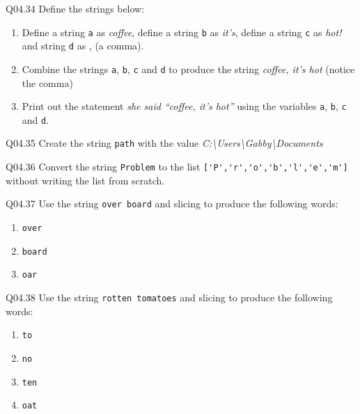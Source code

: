 \documentclass{book}
\newcommand{\passthrough}[1]{#1}
\begin{document}
Q04.34 Define the strings below:

\begin{enumerate}
\def\labelenumi{(\alph{enumi})}
\item
  Define a string \passthrough{\lstinline!a!} as \emph{coffee}, define a
  string \passthrough{\lstinline!b!} as \emph{it's}, define a string
  \passthrough{\lstinline!c!} as \emph{hot!} and string
  \passthrough{\lstinline!d!} as , (a comma).
\item
  Combine the strings \passthrough{\lstinline!a!},
  \passthrough{\lstinline!b!}, \passthrough{\lstinline!c!} and
  \passthrough{\lstinline!d!} to produce the string \emph{coffee, it's
  hot} (notice the comma)
\item
  Print out the statement \emph{she said ``coffee, it's hot''} using the
  variables \passthrough{\lstinline!a!}, \passthrough{\lstinline!b!},
  \passthrough{\lstinline!c!} and \passthrough{\lstinline!d!}.
\end{enumerate}

Q04.35 Create the string \passthrough{\lstinline!path!} with the value
\emph{C:\textbackslash{}Users\textbackslash{}Gabby\textbackslash{}Documents}

Q04.36 Convert the string \passthrough{\lstinline!Problem!} to the list
\passthrough{\lstinline!['P','r','o','b','l','e','m']!} without writing
the list from scratch.

Q04.37 Use the string \passthrough{\lstinline!over board!} and slicing
to produce the following words:

\begin{enumerate}
\def\labelenumi{(\alph{enumi})}
\item
  \passthrough{\lstinline!over!}
\item
  \passthrough{\lstinline!board!}
\item
  \passthrough{\lstinline!oar!}
\end{enumerate}

Q04.38 Use the string \passthrough{\lstinline!rotten tomatoes!} and
slicing to produce the following words:

\begin{enumerate}
\def\labelenumi{(\alph{enumi})}
\item
  \passthrough{\lstinline!to!}
\item
  \passthrough{\lstinline!no!}
\item
  \passthrough{\lstinline!ten!}
\item
  \passthrough{\lstinline!oat!}
\end{enumerate}
    
\end{document}
